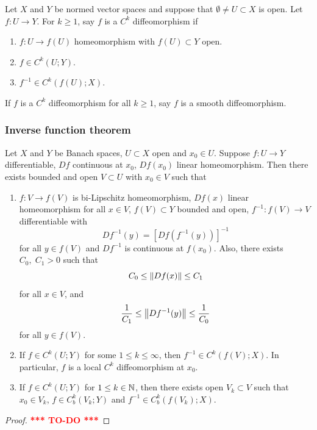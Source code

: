 \documentclass[a4paper]{article}
\newcommand{\TODO}{\textcolor{red}{\textbf{*** TO-DO ***}}}
\begin{document}
\begin{defi}[diffeomorphism]
Let $X$ and $Y$ be normed vector spaces and suppose that
$\emptyset \neq U \subset X$ is open.
Let $f : U \to Y$. For $k \geq 1$, say $f$ is a
$C^k$ diffeomorphism if
\begin{enumerate}
  \item $f: U \to f(U)$ homeomorphism with $f(U) \subset Y$
  open.
  \item $f \in C^k(U ; Y)$.
  \item $f^{-1} \in C^k(f(U); X)$.
\end{enumerate}
If $f$ is a $C^k$ diffeomorphism for all $k \geq 1$,
say $f$ is a smooth diffeomorphism.
\end{defi}

\subsubsection{Inverse function theorem}

\begin{thm}
  Let $X$ and $Y$ be Banach spaces, $U \subset X$ open and
  $x_0 \in U$. Suppose $f: U \to Y$ differentiable,
  $Df$ continuous at $x_0$, $Df(x_0)$ linear homeomorphism.
  Then there exists bounded and open $V \subset U$ with
  $x_0 \in V$ such that
  \begin{enumerate}
    \item $f: V \to f(V)$ is bi-Lipschitz homeomorphism,
    $Df(x)$ linear homeomorphism for all $x \in V$,
    $f(V) \subset Y$ bounded and open, $f^{-1} : f(V) \to V$
    differentiable with
    \[
    Df^{-1}(y) = [Df(f^{-1}(y))]^{-1}
    \]
    for all $y \in f(V)$ and $Df^{-1}$ is continuous
    at $f(x_0)$. Also, there exists $C_0, \; C_1 > 0$
    such that
    \[
    C_0 \leq \left\lVert Df(x)\right\rVert \leq C_1
    \]
    for all $x \in V$, and
    \[
    \frac{1}{C_1} \leq \left\lVert Df^{-1}(y)\right\rVert \leq \frac{1}{C_0}
    \]
    for all $y \in f(V)$.
    \item If $f \in C^k(U; Y)$ for some $1 \leq k \leq \infty$,
    then $f^{-1} \in C^k(f(V); X)$. In particular,
    $f$ is a local $C^k$ diffeomorphism at $x_0$.
    \item If $f \in C^k(U; Y)$ for $1 \leq k \in \mathbb{N}$, then
    there exists open $V_k \subset V$ such that $x_0 \in V_k$,
    $f \in C^k_b(V_k ; Y)$ and $f^{-1} \in C^k_b(f(V_k) ; X)$.
  \end{enumerate}
\end{thm}

\begin{proof}
  \TODO
\end{proof}
\end{document}
